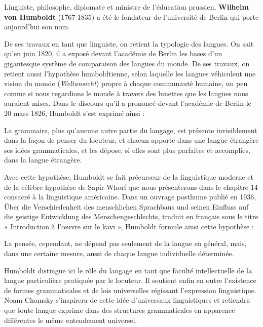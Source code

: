 Linguiste, philosophe, diplomate et ministre de l’éducation prussien, \textbf{Wilhelm von Humboldt} (1767-1835) a été le fondateur de l’université de Berlin qui porte aujourd’hui son nom.

De ses travaux en tant que linguiste, on retient la typologie des langues. On sait qu’en juin 1820, il a exposé devant l’académie de Berlin les bases d’un gigantesque système de comparaison des langues du monde. De ses travaux, on retient aussi l’hypothèse humboldtienne, selon laquelle les langues véhiculent une vision du monde (\textit{Weltansicht}) propre à chaque communauté humaine, un peu comme si nous regardions le monde à travers des lunettes que les langues nous auraient mises. Dans le discours qu’il a prononcé devant l’académie de Berlin le 20 mars 1826, Humboldt s’est exprimé ainsi :
\begin{lecture}{}
La grammaire, plus qu’aucune autre partie du langage, est présente invisiblement dans la façon de penser du locuteur, et chacun apporte dans une langue étrangère ses idées grammaticales, et les dépose, si elles sont plus parfaites et accomplies, dans la langue étrangère.
\end{lecture}
Avec cette hypothèse, Humboldt se fait précurseur de la linguistique moderne et de la célèbre hypothèse de Sapir-Whorf que nous présenterons dans le chapitre 14 consacré à la linguistique américaine. Dans un ouvrage posthume publié en 1936, Über die Verschiedenheit des menschlichen Sprachbaus und seinen Einfluss auf die geistige Entwicklung des Menschengeschlechts, traduit en français sous le titre « Introduction à l’œuvre sur le kavi », Humboldt formule ainsi cette hypothèse :
\begin{lecture}{}
La pensée, cependant, ne dépend pas seulement de la langue en général, mais, dans une certaine mesure, aussi de chaque langue individuelle déterminée.
\end{lecture}
Humboldt distingue ici le rôle du langage en tant que faculté intellectuelle de la langue particulière pratiquée par le locuteur. Il soutient enfin en outre l’existence de formes grammaticales et de lois universelles régissant l’expression linguistique. Noam Chomsky s’inspirera de cette idée d’universaux linguistiques et retiendra que toute langue exprime dans des structures grammaticales en apparence différentes le même entendement universel.

